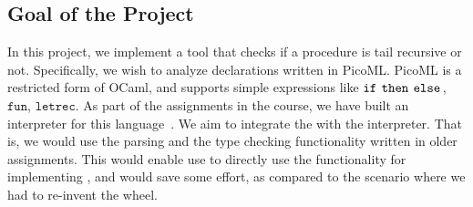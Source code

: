 \subsection{Goal of the Project}
In this project, we implement a tool \tool that checks if a procedure is tail recursive or not.
Specifically, we wish to analyze declarations written in PicoML. 
PicoML is a restricted form of OCaml, and supports simple expressions like  $\mathtt{if} \; \! \; \mathtt{then} \; \! \; \mathtt{else} \; \!$, $\mathtt{fun}$, $\mathtt{let} \! \mathtt{rec}$. 
As part of the assignments in the course, we have built an interpreter for this language~\cite{OlderMP}.
We aim to integrate the \tool with the interpreter. 
That is, we would use the parsing and the type checking functionality written in older assignments.
This would enable use to directly use the functionality for implementing \tool, and would save some  effort, 
as compared to the scenario where we had to re-invent the wheel.